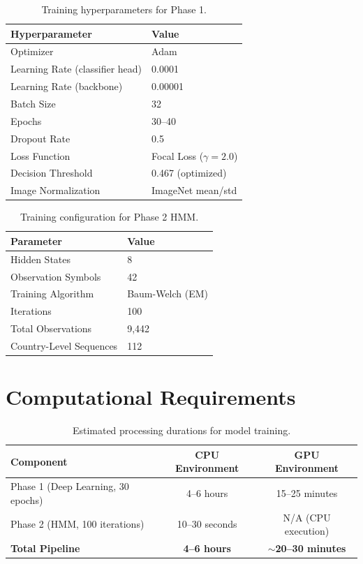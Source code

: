 \documentclass[12pt,a4paper]{report}
\begin{document}
\begin{table}[H]
\begin{center}
\caption{Training hyperparameters for Phase 1.}\label{tab:hyperparams}
\begin{tabular}{ll}
\hline
{\bf Hyperparameter} & {\bf Value} \\
\hline
Optimizer & Adam \\
Learning Rate (classifier head) & 0.0001 \\
Learning Rate (backbone) & 0.00001 \\
Batch Size & 32 \\
Epochs & 30--40 \\
Dropout Rate & 0.5 \\
Loss Function & Focal Loss ($\gamma = 2.0$) \\
Decision Threshold & 0.467 (optimized) \\
Image Normalization & ImageNet mean/std \\
\hline
\end{tabular}
\end{center}
\end{table}

\begin{table}[H]
\begin{center}
\caption{Training configuration for Phase 2 HMM.}\label{tab:hmm_train}
\begin{tabular}{ll}
\hline
{\bf Parameter} & {\bf Value} \\
\hline
Hidden States & 8 \\
Observation Symbols & 42 \\
Training Algorithm & Baum-Welch (EM) \\
Iterations & 100 \\
Total Observations & 9,442 \\
Country-Level Sequences & 112 \\
\hline
\end{tabular}
\end{center}
\end{table}

\section{Computational Requirements}

\begin{table}[H]
\begin{center}
\caption{Estimated processing durations for model training.}\label{tab:traintime}
\begin{tabular}{lcc}
\hline
{\bf Component} & {\bf CPU Environment} & {\bf GPU Environment} \\
\hline
Phase 1 (Deep Learning, 30 epochs) & 4--6 hours & 15--25 minutes \\
Phase 2 (HMM, 100 iterations) & 10--30 seconds & N/A (CPU execution) \\
\hline
{\bf Total Pipeline} & {\bf 4--6 hours} & {\bf $\sim$20--30 minutes} \\
\hline
\end{tabular}
\end{center}
\end{table}
\end{document}
